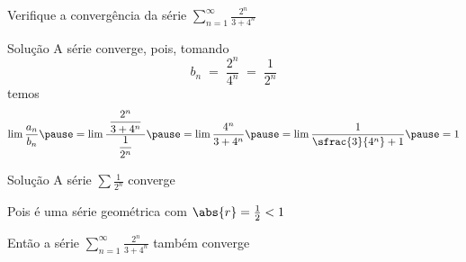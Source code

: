 \begin{question}
  Verifique a convergência da série
  \(
    \sum_{n=1}^\infty \frac{2^n}{3+4^n}
  \)
\end{question}

\begin{resolution}{Solução}
  A série converge\pause, pois, tomando
  \[
    b_n
    \;=\; \frac{2^n}{4^n}
    \;=\; \frac{1}{2^n}
  \]
  \pause
  temos
  \[
    \lim \frac{a_n}{b_n}
    \pause
    = \lim \frac{\;\dfrac{2^n}{3+4^n}\;}{\dfrac{1}{2^n}}
    \pause
    = \lim \frac{4^n}{3+4^n}
    \pause
    = \lim \frac{1}{\sfrac{3}{4^n}+1}
    \pause
    = 1
  \]
\end{resolution}

\begin{resolution}{Solução}
  A série
  \(
    \sum \frac{1}{2^n}
  \)
  converge

  \pause
  \vspace{\baselineskip}
  Pois é uma série geométrica com $\abs{r}=\frac{1}{2}<1$

  \pause
  \vspace{\baselineskip}
  Então a série
  \(
    \sum_{n=1}^\infty \frac{2^n}{3+4^n}
  \)
  também converge
\end{resolution}

